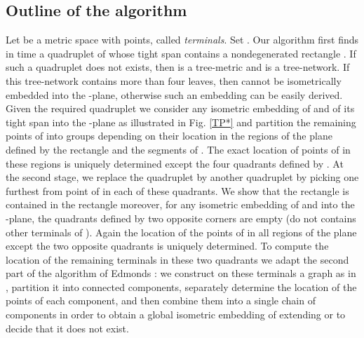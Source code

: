 \documentclass[11pt]{amsart}
\begin{document}
\subsection{Outline of the algorithm} Let  be a metric space with  points, called {\it terminals}. Set .
Our algorithm first finds in  time a
quadruplet  of  whose tight span contains a nondegenerated rectangle . If such a quadruplet
does not exists, then  is a tree-metric and  is a tree-network.  If this
tree-network contains more than four leaves, then  cannot be isometrically embedded into the -plane,
otherwise such an embedding can be easily derived. Given the required
quadruplet  we consider any isometric embedding  of  and of its tight span into the -plane as illustrated in Fig. \ref{TP*}
and partition the
remaining points of  into groups depending on their location in the regions of the plane defined by the rectangle  and the segments
of . The exact location of points of  in these regions is uniquely
determined except the four quadrants defined by . At the second stage, we replace the quadruplet  by another quadruplet   by picking one furthest
from  point of  in each of these quadrants.  We show that the rectangle  is contained in the rectangle  moreover,
for any isometric embedding  of  and  into the -plane,
the quadrants defined by two opposite corners
are empty (do not contains other terminals of ).  Again the location of the points of  in all regions of the plane except the two opposite
quadrants is uniquely determined. To compute the location of the remaining terminals in these two quadrants we adapt the second part of the algorithm of
Edmonds \cite{Ed}: we construct on these terminals a graph as in \cite{Ed}, partition it into connected components, separately determine the location of
the points of each component, and then combine them into
a single chain of components in order to obtain a global isometric embedding  of  extending  or to decide that it does not exist.
\end{document}
